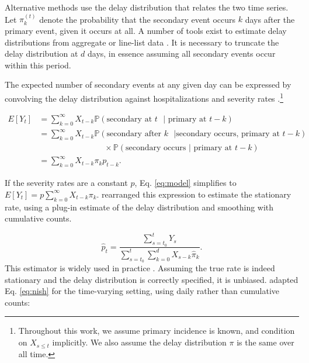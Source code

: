 \documentclass{article}
\begin{document}
Alternative methods use the delay distribution that relates the two time series. Let $\pi_k^{(t)}$ denote the probability that the secondary event occurs $k$ days after the primary event, given it occurs at all. A number of tools exist to estimate delay distributions from aggregate or line-list data \cite{delay_distrs}. It is necessary to truncate the delay distribution at $d$ days, in essence assuming all secondary events occur within this period. 

The expected number of secondary events at any given day can be expressed by convolving the delay distribution against hospitalizations and severity rates \cite{fusedlasso,nishiura}.\footnote{Throughout this work, we assume primary incidence is known, and condition on $X_{s\leq t}$ implicitly. We also assume the delay distribution $\pi$ is the same over all time.}

\begin{align}\label{eq:model}
    E[Y_t] &= \sum_{k=0}^\infty X_{t-k} \mathbb{P}(\text{secondary at $t$ }\vert\text{ primary at }t-k) \nonumber \\
            &= \sum_{k=0}^\infty X_{t-k} \mathbb{P}(\text{secondary after $k$ }\vert\text{secondary occurs, primary at }t-k) \nonumber \\
    &\qquad\qquad\qquad\qquad\times\mathbb{P}(\text{secondary occurs }\vert\text{ primary at $t-k$}) \nonumber \\
    &= \sum_{k=0}^\infty X_{t-k} \pi_k p_{t-k}.%
\end{align}

\noindent If the severity rates are a constant $p$, Eq. \ref{eq:model} simplifies to $E[Y_t] = p\sum_{k=0}^\infty X_{t-k}\pi_k$. \citeauthor{nishiura} rearranged this expression to estimate the stationary rate, using a plug-in estimate of the delay distribution and smoothing with cumulative counts.

\begin{equation}\label{eq:nish}
    \hat{p}_t = \frac{\sum_{s=t_0}^t Y_s}{\sum_{s=t_0}^t \sum_{k=0}^d X_{s-k}\hat\pi_k}.
\end{equation}
This estimator is widely used in practice \cite{nishiuraEx1, nishiuraEx2, Russell2020}. Assuming the true rate is indeed stationary and the delay distribution is correctly specified, it is unbiased. \citeauthor{UKpaper} adapted Eq. \ref{eq:nish} for the time-varying setting, using daily rather than cumulative counts:
\end{document}
